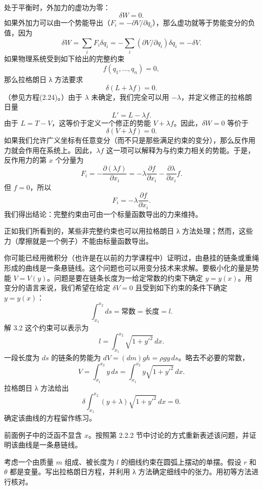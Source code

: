 处于平衡时，外加力的虚功为零：
$$
\delta W = 0.
$$
如果外加力可以由一个势能导出（$F_i = -\partial V/\partial q_i$），那么虚功就等于势能变分的负值，因为
$$
\delta W = \sum_i F_i\delta q_i = -\sum_i(\partial V/\partial q_i)\delta q_i = -\delta V.
$$
如果物理系统受到如下给出的完整约束
$$
f(q_1, \ldots, q_n) = 0,
$$
那么拉格朗日 λ 方法要求
$$
\delta(L + \lambda f) = 0.
$$
（参见方程(2.24)。）由于 $\lambda$ 未确定，我们完全可以用 $-\lambda$，并定义修正的拉格朗日量
$$
L' = L - \lambda f.
$$
由于 $L = T - V$，这等价于定义一个修正的势能 $V + \lambda f$。因此，$\delta W = 0$ 等价于
$$
\delta(V + \lambda f) = 0.
$$
如果我们允许广义坐标有任意变分（而不只是那些满足约束的变分），那么反作用力就会作用在系统上。因此，$\lambda f$ 这一项可以解释为与约束力相关的势能。于是，反作用力的第 $x$ 个分量为
$$
F_i = -\frac{\partial(\lambda f)}{\partial x_i} = -\lambda\frac{\partial f}{\partial x_i} - \frac{\partial\lambda}{\partial x_i}f.
$$
但 $f = 0$，所以
$$
F_i = -\lambda\frac{\partial f}{\partial x_i}.
$$
我们得出结论：完整约束由可由一个标量函数导出的力来维持。

正如我们所看到的，某些非完整约束也可以用拉格朗日 λ 方法处理；然而，这些力（摩擦就是一个例子）不能由标量函数导出。

\begin{example}
你可能已经用微积分（也许是在以前的力学课程中）证明过，由悬挂的链条或重绳形成的曲线是一条悬链线。这个问题也可以用变分技术来求解。要极小化的量是势能 $V = V(y)$。问题是要在链条长度为一给定常数的约束下确定 $y = y(x)$。用变分的语言来说，我们希望在给定 $\delta V = 0$ 且受到如下约束的条件下确定 $y = y(x)$：
$$
\int_{x_1}^{x_2}ds = \text{常数} = \text{长度} = l.
$$
解 3.2 这个约束可以表示为
$$
l = \int_{x_1}^{x_2}\sqrt{1 + y'^2}\,dx.
$$
一段长度为 $ds$ 的链条的势能为 $dV = (dm)gh = \rho gy\,ds$。略去不必要的常数，
$$
V = \int_{x_1}^{x_2}y\,ds = \int_{x_1}^{x_2}y\sqrt{1 + y'^2}\,dx.
$$
拉格朗日 λ 方法给出
$$
\delta\int_{x_1}^{x_2}(y + \lambda)\sqrt{1 + y'^2}\,dx = 0.
$$
确定该曲线的方程留作练习。
\end{example}

\begin{exercise}
前面例子中的泛函不显含 $x$。按照第 2.2.2 节中讨论的方式重新表述该问题，并证明该曲线是一条悬链线。
\end{exercise}

\begin{exercise}
考虑一个由质量 $m$ 组成、被长度为 $l$ 的细线约束在圆弧上摆动的单摆。假设 $r$ 和 $\theta$ 都是变量。写出拉格朗日方程，并利用 λ 方法确定细线中的张力。用初等方法进行核对。
\end{exercise}

